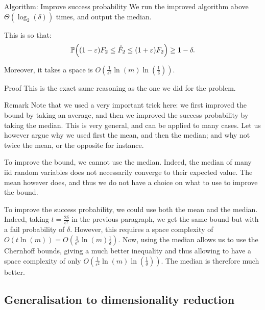 \documentclass[a4paper]{article}
\begin{document}
\begin{parag}{Algorithm: Improve success probability}
    We run the improved algorithm above $\Theta\left(\log_2\left(\delta\right)\right)$ times, and output the median. 

    This is so that:
    \[\prob\left(\left(1 - \epsilon\right) F_2 \leq \hat{F}_2 \leq \left(1 + \epsilon\right) F_2\right) \geq 1 - \delta.\]

    Moreover, it takes a space is $O\left(\frac{1}{\epsilon^2} \ln\left(m\right) \ln\left(\frac{1}{\delta}\right)\right)$.

    \begin{subparag}{Proof}
        This is the exact same reasoning as the one we did for the  problem.
    \end{subparag}

    \begin{subparag}{Remark}
        Note that we used a very important trick here: we first improved the bound by taking an average, and then we improved the success probability by taking the median. This is very general, and can be applied to many cases. Let us however argue why we used first the mean, and then the median; and why not twice the mean, or the opposite for instance.

        To improve the bound, we cannot use the median. Indeed, the median of many iid random variables does not necessarily converge to their expected value. The mean however does, and thus we do not have a choice on what to use to improve the bound.

        To improve the success probability, we could use both the mean and the median. Indeed, taking $t = \frac{2 \delta}{\epsilon^2}$ in the previous paragraph, we get the same bound but with a fail probability of $\delta$. However, this requires a space complexity of $O\left(t \ln\left(m\right)\right) = O\left(\frac{1}{\epsilon^2} \ln\left(m\right) \frac{1}{\delta}\right)$. Now, using the median allows us to use the Chernhoff bounds, giving a much better inequality and thus allowing to have a space complexity of only $O\left(\frac{1}{\epsilon^2} \ln\left(m\right) \ln\left(\frac{1}{\delta}\right)\right)$. The median is therefore much better.
    \end{subparag}
\end{parag}

\subsection{Generalisation to dimensionality reduction}
\end{document}
